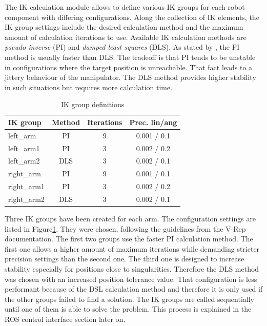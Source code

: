 The IK calculation module allows to define various IK groups for each robot component with differing configurations. Along the collection of IK elements, the IK group settings include the desired calculation method and the maximum amount of calculation iterations to use. Available IK calculation methods are \emph{pseudo inverse} (PI) and \emph{damped least squares} (DLS). As stated by \cite{buss2004}, the PI method is usually faster than DLS. The tradeoff is that PI tends to be unstable in configurations where the target position is unreachable. That fact leads to a jittery behaviour of the manipulator. The DLS method provides higher stability in such situations but requires more calculation time.

\begin{table}[h]
  \centering
  \begin{tabular}[h]{|l|c|c|c|} \hline
	\textbf{IK group} & \textbf{Method} & \textbf{Iterations} & \textbf{Prec. lin/ang} \\ \hline
	left\_arm & PI & 9 & 0.001 / 0.1  \\
	left\_arm1 & PI & 3 & 0.002 / 0.2  \\
	left\_arm2 & DLS & 3 & 0.002 / 0.1  \\
	right\_arm & PI & 9 & 0.001 / 0.1  \\
	right\_arm1 & PI & 3 & 0.002 / 0.2  \\
	right\_arm2 & DLS & 3 & 0.002 / 0.1  \\ \hline
  \end{tabular}
  \caption{IK group definitions}
  \label{fig:ik_defs}
\end{table}

Three IK groups have been created for each arm. The configuration settings are listed in Figure\ref{fig:ik_defs}. They were chosen, following the guidelines from the V-Rep documentation. The first two groups use the faster PI calculation method. The first one allows a higher amount of maximum iterations while demanding stricter precision settings than the second one. The third one is designed to increase stability especially for positions close to singularities. Therefore the DLS method was chosen with an increased position tolerance value. That configuration is less performant because of the DSL calculation method and therefore it is only used if the other groups failed to find a solution. The IK groups are called sequentially until one of them is able to solve the problem. This process is explained in the ROS control interface section later on.

